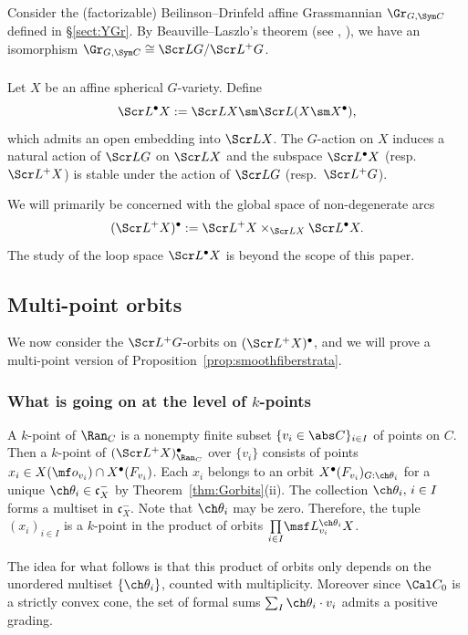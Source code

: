 \documentclass[final]{amsart}
\theoremstyle{remark}
\theoremstyle{definition}
\numberwithin{equation}{section}
\begin{document}
Consider the (factorizable) Beilinson--Drinfeld affine Grassmannian $\Gr_{G,\Sym C}$ defined in \S\ref{sect:YGr}. 
By Beauville--Laszlo's theorem (see \cite[Remark 2.3.7]{BD}, \cite[Proposition 3.1.9]{Xinwen}), we have an isomorphism 
$ \Gr_{G,\Sym C} \cong \Scr L G / \Scr L^+ G$. 


\subsubsection{} Let $X$ be an affine spherical 
$G$-variety. Define 
\[
    \Scr L^\bullet X := \Scr L X \sm \Scr L(X\sm X^\bullet),
\]
which admits an open embedding into $\Scr L X$. 
The $G$-action on $X$ induces a natural action of $\Scr L G$ on 
$\Scr L X$ and the subspace $\Scr L^\bullet X$ (resp.~$\Scr L^+ X$) is stable under the action of 
$\Scr L G$ (resp.~$\Scr L^+ G$). 

We will primarily be concerned with the global space of 
non-degenerate arcs
\[ (\Scr L^+X)^\bullet := \Scr L^+X \times_{\Scr L X} \Scr L^\bullet X.\] 
The study of the loop space $\Scr L^\bullet X$ is beyond the scope of 
this paper.


\subsection{Multi-point orbits} \label{sect:defstrata}
We now consider the $\Scr L^+G$-orbits on $(\Scr L^+X)^\bullet$, and
we will prove a multi-point version of Proposition~\ref{prop:smoothfiberstrata}.

\subsubsection{What is going on at the level of $k$-points} 
A $k$-point of $\Ran_C$ is a nonempty finite subset 
$\{ v_i \in \abs C \}_{i\in I}$ of points on $C$. 
Then a $k$-point of $(\Scr L^+X)^\bullet_{\Ran_C}$ over $\{v_i\}$ consists
of points $x_i \in X(\mf o_{v_i}) \cap X^\bullet(F_{v_i})$. 
Each $x_i$ belongs to an orbit $X^\bullet(F_{v_i})_{G:\ch\theta_i}$
for a unique $\ch\theta_i \in \mathfrak c_X^-$ by Theorem~\ref{thm:Gorbits}(ii). 
The collection $\ch\theta_{i},\, i\in I$ forms a multiset
in $\mathfrak c_X^-$. 
Note that $\ch\theta_{i}$ may be zero. 
Therefore, the tuple $(x_i)_{i\in I}$ is a $k$-point in the product of orbits 
$\underset{i\in I}\prod \msf L^{\ch\theta_i}_{v_i} X$.

The idea for what follows is that this product of orbits only depends on
the unordered multiset $\{\ch\theta_i\}$, counted with multiplicity. 
Moreover since $\Cal C_0$ is a strictly convex cone, 
the set of formal sums $\sum_I \ch\theta_i \cdot v_i$ admits a positive grading.
\end{document}
